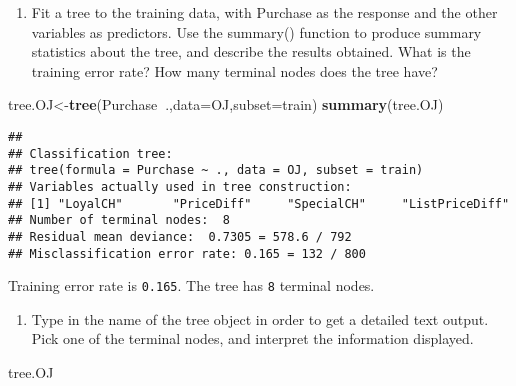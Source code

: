 \documentclass[]{article}
\newenvironment{Shaded}{\begin{snugshade}}{\end{snugshade}}
\newcommand{\KeywordTok}[1]{\textcolor[rgb]{0.13,0.29,0.53}{\textbf{#1}}}
\newcommand{\DataTypeTok}[1]{\textcolor[rgb]{0.13,0.29,0.53}{#1}}
\newcommand{\OperatorTok}[1]{\textcolor[rgb]{0.81,0.36,0.00}{\textbf{#1}}}
\newcommand{\NormalTok}[1]{#1}
\providecommand{\tightlist}{%
  \setlength{\itemsep}{0pt}\setlength{\parskip}{0pt}}
\begin{document}
\begin{enumerate}
\def\labelenumi{(\alph{enumi})}
\setcounter{enumi}{1}
\tightlist
\item
  Fit a tree to the training data, with Purchase as the response and the
  other variables as predictors. Use the summary() function to produce
  summary statistics about the tree, and describe the results obtained.
  What is the training error rate? How many terminal nodes does the tree
  have?
\end{enumerate}

\begin{Shaded}
\begin{Highlighting}[]
\NormalTok{tree.OJ<-}\KeywordTok{tree}\NormalTok{(Purchase}\OperatorTok{~}\NormalTok{.,}\DataTypeTok{data=}\NormalTok{OJ,}\DataTypeTok{subset=}\NormalTok{train)}
\KeywordTok{summary}\NormalTok{(tree.OJ)}
\end{Highlighting}
\end{Shaded}

\begin{verbatim}
## 
## Classification tree:
## tree(formula = Purchase ~ ., data = OJ, subset = train)
## Variables actually used in tree construction:
## [1] "LoyalCH"       "PriceDiff"     "SpecialCH"     "ListPriceDiff"
## Number of terminal nodes:  8 
## Residual mean deviance:  0.7305 = 578.6 / 792 
## Misclassification error rate: 0.165 = 132 / 800
\end{verbatim}

Training error rate is \texttt{0.165}. The tree has \texttt{8} terminal
nodes.

\begin{enumerate}
\def\labelenumi{(\alph{enumi})}
\setcounter{enumi}{2}
\tightlist
\item
  Type in the name of the tree object in order to get a detailed text
  output. Pick one of the terminal nodes, and interpret the information
  displayed.
\end{enumerate}

\begin{Shaded}
\begin{Highlighting}[]
\NormalTok{tree.OJ}
\end{Highlighting}
\end{Shaded}
\end{document}
